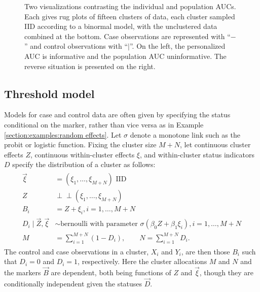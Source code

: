 \documentclass[12pt]{article}
\newcommand{\cind}{\perp \!\!\! \perp}
\begin{document}
\begin{figure}[!tbp]
  \centering
  \hfill
  \caption{Two visualizations contrasting the individual and
    population AUCs. Each gives rug plots of fifteen clusters of data, each cluster sampled IID
    according to a binormal model, with the unclustered
    data combined at the bottom. Case observations are represented with ``$-$'' and
    control observations with ``$|$''. On the left, the personalized AUC is
    informative and the population AUC uninformative. The reverse situation is
    presented on the right.}  \label{fig:comparison}
\end{figure}

\subsection{Threshold model}\label{section:examples:threshold}
Models for case and control data are often given by specifying the
status conditional on the marker, rather than vice versa as in
Example \ref{section:examples:random effects}. Let $\sigma$ denote a monotone link such as the probit or logistic function. Fixing the cluster size $M+N$, let continuous cluster
effects $Z$, continuous within-cluster effects $\xi$, and within-cluster
 status indicators $D$ specify the distribution of a cluster as follows:
\begin{gather}
  \begin{aligned}
    \vec{\xi}&=(\xi_1,\ldots,\xi_{M+N})\text{ IID}\\
    Z &\cind (\xi_1,\ldots,\xi_{M+N}) \\
    B_i &= Z+\xi_i,i=1,\ldots,M+N\\
    D_i \mid \vec{Z},\vec{\xi} &\sim \text{bernoulli with parameter } \sigma(\beta_0 Z+\beta_1\xi_i),i=1,\ldots,M+N\\
    M &= \sum_{i=1}^{M+N} (1-D_i),\qquad     N = \sum_{i=1}^{M+N} D_i.
    \label{model:logistic}
\end{aligned}
\end{gather}
The control and case observations in a cluster, $X_i$ and $Y_i$, are then those $B_i$ such that $D_i=0$ and $D_i=1$, respectively. Here the cluster allocations $M$ and $N$ and the markers $\vec{B}$ are dependent, both being functions of $Z$ and $\vec{\xi}$, though they are conditionally independent given the statuses $\vec{D}$.
\end{document}
